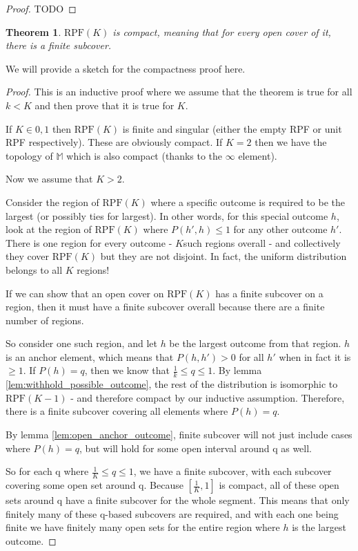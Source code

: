 \documentclass[twoside]{article}
\theoremstyle{plain}%
\newtheorem{theorem}{Theorem}[section]
\theoremstyle{definition}
\theoremstyle{remark}
\begin{document}
\begin{proof}
TODO
\end{proof}

\begin{theorem}
\(\text{RPF}(K)\) is \textit{compact}, meaning that for every open cover of it, there is a finite subcover.
\end{theorem}

We will provide a sketch for the compactness proof here.

\begin{proof}
This is an inductive proof where we assume that the theorem is true for all \(k < K\) and then prove that it is true for \(K\).

If \(K \in {0, 1}\) then \(\text{RPF}(K)\) is finite and singular (either the empty RPF or unit RPF respectively). These are obviously compact. If \(K = 2\) then we have the topology of \(\mathbb{M}\) which is also compact (thanks to the \(\infty\) element).

Now we assume that \(K > 2\).

Consider the region of \(\text{RPF}(K)\) where a specific outcome is required to be the largest (or possibly ties for largest). In other words, for this special outcome \(h\), look at the region of \(\text{RPF}(K)\) where \(P(h', h) \leq  1\) for any other outcome \(h'\). There is one region for every outcome - \(K\)such regions overall - and collectively they cover \(\text{RPF}(K)\) but they are not disjoint. In fact, the uniform distribution belongs to all \(K\) regions!

If we can show that an open cover on \(\text{RPF}(K)\) has a finite subcover on a region, then it must have a finite subcover overall because there are a finite number of regions.

So consider one such region, and let \(h\) be the largest outcome from that region. \(h\) is an anchor element, which means that \(P(h, h') > 0\) for all \(h'\) when in fact it is \(\geq 1\). If \(P(h) = q\), then we know that \(\frac{1}{k} \leq q \leq 1\). By lemma \ref{lem:withhold_possible_outcome}, the rest of the distribution is isomorphic to \(\text{RPF}(K - 1)\) - and therefore compact by our inductive assumption. Therefore, there is a finite subcover covering all elements where \(P(h) = q\).

By lemma \ref{lem:open_anchor_outcome}, finite subcover will not just include cases where \(P(h) = q\), but will hold for some open interval around q as well.

So for each q where \(\frac{1}{K} \leq q \leq 1\), we have a finite subcover, with each subcover covering some open set around q. Because \([\frac{1}{K}, 1]\) is compact, all of these open sets around q have a finite subcover for the whole segment. This means that only finitely many of these q-based subcovers are required, and with each one being finite we have finitely many open sets for the entire region where \(h\) is the largest outcome.
\end{proof}
\end{document}
